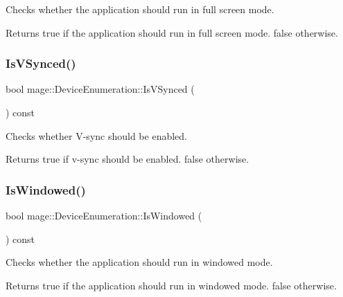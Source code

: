 Checks whether the application should run in full screen mode.

\begin{DoxyReturn}{Returns}
{\ttfamily true} if the application should run in full screen mode. {\ttfamily false} otherwise. 
\end{DoxyReturn}
\hypertarget{classmage_1_1_device_enumeration_a035e2430142e4e4ffcbc712f83e1e7e0}{}\label{classmage_1_1_device_enumeration_a035e2430142e4e4ffcbc712f83e1e7e0} 
\subsubsection{\texorpdfstring{Is\+V\+Synced()}{IsVSynced()}}
{\footnotesize\ttfamily bool mage\+::\+Device\+Enumeration\+::\+Is\+V\+Synced (\begin{DoxyParamCaption}{ }\end{DoxyParamCaption}) const}

Checks whether V-\/sync should be enabled.

\begin{DoxyReturn}{Returns}
{\ttfamily true} if v-\/sync should be enabled. {\ttfamily false} otherwise. 
\end{DoxyReturn}
\hypertarget{classmage_1_1_device_enumeration_a51479c8c85b286f78730c5622604e524}{}\label{classmage_1_1_device_enumeration_a51479c8c85b286f78730c5622604e524} 
\subsubsection{\texorpdfstring{Is\+Windowed()}{IsWindowed()}}
{\footnotesize\ttfamily bool mage\+::\+Device\+Enumeration\+::\+Is\+Windowed (\begin{DoxyParamCaption}{ }\end{DoxyParamCaption}) const}

Checks whether the application should run in windowed mode.

\begin{DoxyReturn}{Returns}
{\ttfamily true} if the application should run in windowed mode. {\ttfamily false} otherwise. 
\end{DoxyReturn}
\hypertarget{classmage_1_1_device_enumeration_a03e3affa2b8bb4837cffda7b11389bea}{}\label{classmage_1_1_device_enumeration_a03e3affa2b8bb4837cffda7b11389bea} 
